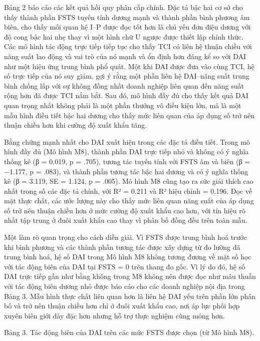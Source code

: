 \documentclass[12pt,a4paper]{article}
\begin{document}
Bảng 2 báo cáo các kết quả hồi quy phân cấp chính. Đặc tả bậc hai cơ sở
cho thấy thành phần FSTS tuyến tính dương mạnh và thành phần bình phương
âm biên, cho thấy mối quan hệ I--P được đọc tốt hơn là chủ yếu đơn điệu
dương với độ cong bậc hai nhẹ thay vì một hình chữ U ngược được thiết
lập chính thức. Các mô hình tác động trực tiếp tiếp tục cho thấy TCI có
liên hệ thuận chiều với năng suất lao động và vai trò của nó mạnh và ổn
định hơn đáng kể so với DAI như một hiệu ứng trung bình phổ quát. Một
khi DAI được đưa vào cùng TCI, hệ số trực tiếp của nó suy giảm, gợi ý
rằng một phần liên hệ DAI--năng suất trung bình chồng lấp với sự không
đồng nhất doanh nghiệp liên quan đến năng suất rộng hơn đã được TCI nắm
bắt. Sau đó, mô hình đầy đủ cho thấy kết quả DAI quan trọng nhất không
phải là một phần thưởng vô điều kiện lớn, mà là một mẫu hình điều tiết
bậc hai dương cho thấy mức liên quan của áp dụng số trở nên thuận chiều
hơn khi cường độ xuất khẩu tăng.

Bằng chứng mạnh nhất cho DAI xuất hiện trong các đặc tả điều tiết. Trong
mô hình đầy đủ (Mô hình M8), thành phần DAI trực tiếp nhỏ và không có ý
nghĩa thống kê (β = 0.019, p = .705), tương tác tuyến tính với FSTS âm
và biên (β = −1.177, p = .083), và thành phần tương tác bậc hai dương và
có ý nghĩa thống kê (β = 3.119, SE = 1.124, p = .005). Mô hình M8 cũng
tạo ra sức giải thích cao nhất trong số các đặc tả chính, với R² = 0.211
và R² hiệu chỉnh = 0.196. Đọc về mặt thực chất, các ước lượng này cho
thấy mức liên quan năng suất của áp dụng số trở nên thuận chiều hơn ở
mức cường độ xuất khẩu cao hơn, với tín hiệu rõ nhất tập trung ở đuôi
xuất khẩu cao thay vì phân bố đồng đều trên toàn mẫu.

Một làm rõ quan trọng cho cách diễn giải. Vì FSTS được trung bình hoá
trước khi bình phương và các thành phần tương tác được xây dựng từ đo
lường đã trung bình hoá, hệ số DAI trong Mô hình M8 không tương đương về
mặt số học với tác động biên của DAI tại FSTS = 0 trên thang đo gốc. Vì
lý do đó, hệ số DAI trực tiếp gần như bằng không trong M8 không nên được
đọc như mâu thuẫn với tác động biên dương nhỏ được báo cáo cho các doanh
nghiệp nội địa trong Bảng 3. Mẫu hình thực chất liên quan hơn là liên hệ
DAI yếu trên phần lớn phân bố và trở nên thuận chiều hơn chỉ ở đuôi xuất
khẩu cao, nơi áp lực phối hợp xuyên biên giới dày đặc hơn nhưng hỗ trợ
thực nghiệm cũng mỏng hơn.

Bảng 3. Tác động biên của DAI trên các mức FSTS được chọn (từ Mô hình
M8).
\end{document}

